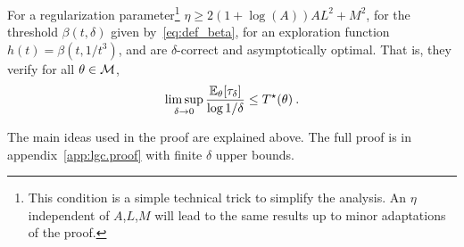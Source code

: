 \begin{theorem}\label{thm:sample_complexity}
For a regularization parameter\footnote{This condition is a simple technical trick to simplify the analysis. An $\eta$ independent of $A$,$L$,$M$ will lead to the same results up to minor adaptations of the proof.} $\eta \geq 2(1+\log(A))AL^2+M^2$, for the threshold $\beta(t,\delta)$ given by~\eqref{eq:def_beta}, for an exploration function $h(t)=\beta(t,1/t^3)$, \LG and \LGC are $\delta$-correct and asymptotically optimal. That is, they verify for all $\theta\in \mathcal{M}$,
\begin{align*}
\limsup_{\delta\to 0}\frac{\mathbb{E}_\theta[\tau_\delta]}{ \log 1/\delta} \le T^{\star}(\theta) \: .
\end{align*}
\end{theorem}
The main ideas used in the proof are explained above. The full proof is in appendix~\ref{app:lgc.proof} with finite $\delta$ upper bounds.
